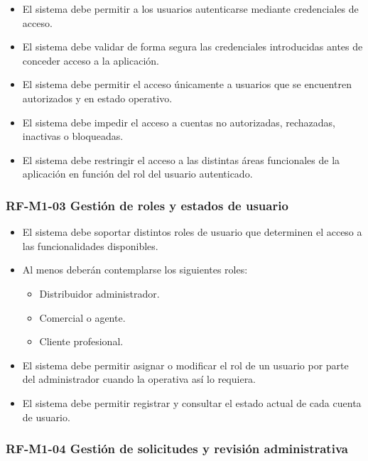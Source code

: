 \begin{itemize}
    \item El sistema debe permitir a los usuarios autenticarse mediante credenciales de acceso.
    \item El sistema debe validar de forma segura las credenciales introducidas antes de conceder acceso a la aplicación.
    \item El sistema debe permitir el acceso únicamente a usuarios que se encuentren autorizados y en estado operativo.
    \item El sistema debe impedir el acceso a cuentas no autorizadas, rechazadas, inactivas o bloqueadas.
    \item El sistema debe restringir el acceso a las distintas áreas funcionales de la aplicación en función del rol del usuario autenticado.
\end{itemize}

\vspace{-0.75em}
\subsubsection{RF-M1-03 Gestión de roles y estados de usuario}
\vspace{-1em}

\begin{itemize}
    \item El sistema debe soportar distintos roles de usuario que determinen el acceso a las funcionalidades disponibles.
    \item Al menos deberán contemplarse los siguientes roles:
          \begin{itemize}
              \item Distribuidor administrador.
              \item Comercial o agente.
              \item Cliente profesional.
          \end{itemize}
    \item El sistema debe permitir asignar o modificar el rol de un usuario por parte del administrador cuando la operativa así lo requiera.
    \item El sistema debe permitir registrar y consultar el estado actual de cada cuenta de usuario.
\end{itemize}

\vspace{-0.75em}
\subsubsection{RF-M1-04 Gestión de solicitudes y revisión administrativa}
\vspace{-1em}

